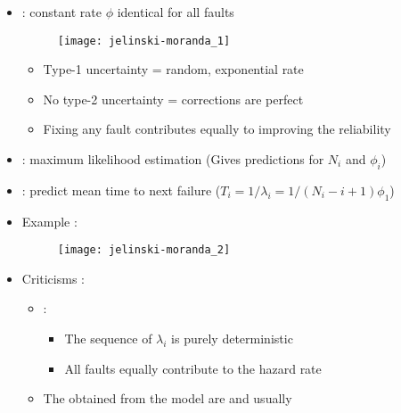 \begin{itemize}
    \item {} : constant rate $\phi$ identical for all faults
    \begin{figure}[H]
        \centering
        \texttt{[image: jelinski-moranda\_1]}
    \end{figure}
    \begin{itemize}
        \item Type-1 uncertainty = random, exponential rate
        \item No type-2 uncertainty = corrections are perfect
        \item Fixing any fault contributes equally to improving the reliability
    \end{itemize}
    \item {} : maximum likelihood estimation (Gives predictions for $N_i$ and $\phi_i$)
    \item {} : predict mean time to next failure ($T_i = 1/\lambda_i = 1/(N_i - i + 1)\phi_1$)
\end{itemize}
\begin{minipage}[t]{0.48\textwidth}
    \begin{itemize}
        \item Example :
        \begin{figure}[H]
            \centering
            \texttt{[image: jelinski-moranda\_2]}
        \end{figure}
    \end{itemize}
\end{minipage}
\hfill
\begin{minipage}[t]{0.48\textwidth}
    \begin{itemize}
        \item Criticisms :
        \begin{itemize}
            \item {} :
            \begin{itemize}
                \item The sequence of $\lambda_i$ is purely deterministic
                \item All faults equally contribute to the hazard rate
            \end{itemize}
            \item The  obtained from the model are  and usually 
        \end{itemize}
    \end{itemize}
\end{minipage}

